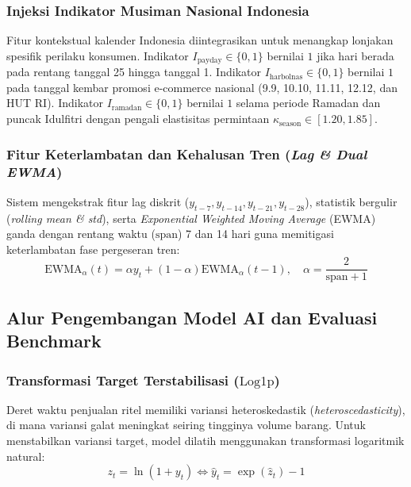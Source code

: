 \documentclass[12pt,a4paper]{article}
\begin{document}
\subsubsection{Injeksi Indikator Musiman Nasional Indonesia}
Fitur kontekstual kalender Indonesia diintegrasikan untuk menangkap lonjakan spesifik perilaku konsumen. Indikator $I_{\text{payday}} \in \{0, 1\}$ bernilai $1$ jika hari berada pada rentang tanggal 25 hingga tanggal 1. Indikator $I_{\text{harbolnas}} \in \{0, 1\}$ bernilai $1$ pada tanggal kembar promosi e-commerce nasional (9.9, 10.10, 11.11, 12.12, dan HUT RI). Indikator $I_{\text{ramadan}} \in \{0, 1\}$ bernilai $1$ selama periode Ramadan dan puncak Idulfitri dengan pengali elastisitas permintaan $\kappa_{\text{season}} \in [1.20, 1.85]$.

\subsubsection{Fitur Keterlambatan dan Kehalusan Tren (\textit{Lag \& Dual EWMA})}
Sistem mengekstrak fitur lag diskrit ($y_{t-7}, y_{t-14}, y_{t-21}, y_{t-28}$), statistik bergulir (\textit{rolling mean \& std}), serta \textit{Exponential Weighted Moving Average} (EWMA) ganda dengan rentang waktu ($\text{span}$) 7 dan 14 hari guna memitigasi keterlambatan fase pergeseran tren:
\begin{equation}
    \text{EWMA}_{\alpha}(t) = \alpha y_t + (1 - \alpha) \text{EWMA}_{\alpha}(t-1), \quad \alpha = \frac{2}{\text{span} + 1}
\end{equation}

\subsection{Alur Pengembangan Model AI dan Evaluasi Benchmark}

\subsubsection{Transformasi Target Terstabilisasi (\texorpdfstring{$\text{Log1p}$}{Log1p})}
Deret waktu penjualan ritel memiliki variansi heteroskedastik (\textit{heteroscedasticity}), di mana variansi galat meningkat seiring tingginya volume barang. Untuk menstabilkan variansi target, model dilatih menggunakan transformasi logaritmik natural:
\begin{equation}
    z_t = \ln(1 + y_t) \iff \hat{y}_t = \exp(\hat{z}_t) - 1
\end{equation}
\end{document}
